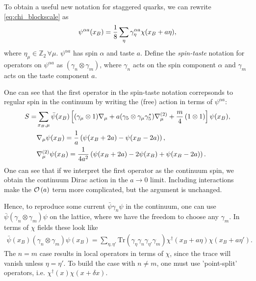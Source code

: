     To obtain a useful new notation for staggered quarks, we can rewrite \eqref{eq:chi_blockscale} as
    \begin{align}
      \psi^{\alpha a}(x_B) = {1\over 8} \sum_{\eta} \gamma_{\eta}^{\alpha a} \chi(x_B+a\eta),
    \end{align}
    where $\eta_{\mu}\in \mathbb{Z}_2\,\forall \mu$. $\psi^{\alpha a}$ has spin $\alpha$ and taste $a$. Define the {\it{spin-taste}} notation for operators on $\psi^{\alpha a}$ as $(\gamma_n\otimes \gamma_m)$, where $\gamma_n$ acts on the spin component $\alpha$ and $\gamma_m$ acts on the taste component $a$. 

    One can see that the first operator in the spin-taste notation correpsonds to regular spin in the continuum by writing the (free) action in terms of $\psi^{\alpha a}$:
    \begin{align}
      \nonumber
      S =& \sum_{x_B,\mu} \bar{\psi}(x_B) \left[ (\gamma_{\mu}\otimes 1) \nabla_{\mu} + a ( \gamma_5 \otimes \gamma_{\mu} \gamma^*_5 ) \nabla^{(2)}_{\mu} + {m\over 4}\, (1\otimes 1)  \right] \psi(x_B), \\
      \nonumber
      &\nabla_{\mu}\psi(x_B) = {1\over a}\left( \psi(x_B+2a) - \psi(x_B-2a) \right), \\
      &\nabla^{(2)}_{\mu}\psi(x_B) = {1\over 4a^2}\left( \psi(x_B+2a) - 2\psi(x_B) + \psi(x_B-2a) \right).
    \end{align}
    One can see that if we interpret the first operator as the continuum spin, we obtain the continuum Dirac action in the $a\to 0$ limit. Including interactions make the $\mathcal{O}\left( a \right)$ term more complicated, but the argument is unchanged.

    Hence, to reproduce some current $\bar{\psi}\gamma_n\psi$ in the continuum, one can use $\bar{\psi}(\gamma_n\otimes \gamma_m)\psi$ on the lattice, where we have the freedom to choose any $\gamma_m$. In terms of $\chi$ fields these look like
    \begin{align}
      \bar{\psi}(x_B)(\gamma_n\otimes \gamma_m) \psi(x_B) = \sum_{\eta,\eta'} \text{Tr} (\gamma_{\eta} \gamma_n \gamma_{\eta'} \gamma_m) \chi^{\dagger}(x_B+a\eta) \chi(x_B+a\eta').
    \end{align}
    The $n=m$ case results in local operators in terms of $\chi$, since the trace will vanish unless $\eta=\eta'$. To build the case with $n\neq m$, one must use 'point-split' operators, i.e. $\chi^{\dagger} (x) \chi(x+\delta x)$.

